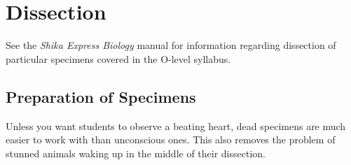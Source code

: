 \chapter{Dissection} 

See the \emph{Shika Express Biology} manual for information regarding dissection of particular specimens covered in the O-level syllabus.

\section{Preparation of Specimens} 

Unless you want students to observe a beating heart, 
dead specimens are much easier to work with than unconscious ones. 
This also removes the problem of stunned animals waking up 
in the middle of their dissection.


